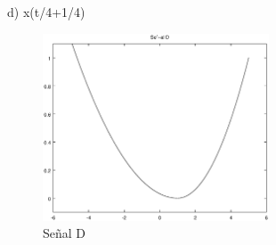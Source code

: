 \documentclass[10pt,a4paper]{report}
\begin{document}
d) x(t/4+1/4)

\begin{figure}[H]
\centering
\includegraphics[width=0.6\textwidth]{SignalD}
\caption{Señal D}
\label{fig:SignalD}
\end{figure}
\end{document}
